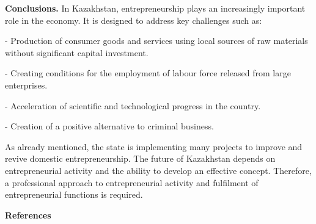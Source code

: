 \begin{multicols}{2}
{\bfseries Conclusions.} In Kazakhstan, entrepreneurship plays an
increasingly important role in the economy. It is designed to address
key challenges such as:

- Production of consumer goods and services using local sources of raw
materials without significant capital investment.

- Creating conditions for the employment of labour force released from
large enterprises.

- Acceleration of scientific and technological progress in the country.

- Creation of a positive alternative to criminal business.

As already mentioned, the state is implementing many projects to improve
and revive domestic entrepreneurship. The future of Kazakhstan depends
on entrepreneurial activity and the ability to develop an effective
concept. Therefore, a professional approach to entrepreneurial activity
and fulfilment of entrepreneurial functions is required.
\end{multicols}

\begin{center}
  {\bfseries References}
  \end{center}
  
